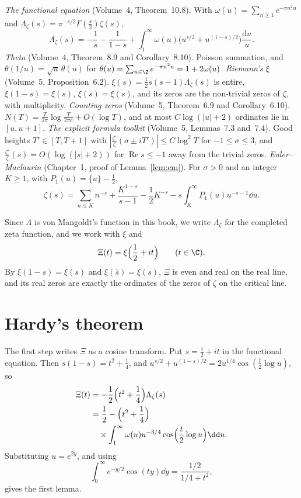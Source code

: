 \begin{reminder}
\emph{The functional equation} (Volume~4, Theorem~10.8). With $\omega(u)=\sum_{n\ge1}e^{-\pi n^2u}$ and $\Lambda_\zeta(s)=\pi^{-s/2}\Gamma(\frac s2)\zeta(s)$,
\[
\Lambda_\zeta(s)=-\frac1s-\frac1{1-s}+\int_1^\infty\omega(u)\bigl(u^{s/2}+u^{(1-s)/2}\bigr)\frac{\mathrm du}u.
\]
\emph{Theta} (Volume~4, Theorem~8.9 and Corollary~8.10). Poisson summation, and $\theta(1/u)=\sqrt u\,\theta(u)$ for $\theta(u)=\sum_{n\in\Z}e^{-\pi n^2u}=1+2\omega(u)$.
\emph{Riemann's $\xi$} (Volume~5, Proposition~6.2). $\xi(s)=\frac12s(s-1)\Lambda_\zeta(s)$ is entire, $\xi(1-s)=\xi(s)$, $\xi(\bar s)=\overline{\xi(s)}$, and its zeros are the non-trivial zeros of $\zeta$, with multiplicity.
\emph{Counting zeros} (Volume~5, Theorem~6.9 and Corollary~6.10). $N(T)=\frac T{2\pi}\log\frac T{2\pi e}+O(\log T)$, and at most $C\log(|u|+2)$ ordinates lie in $[u,u+1]$.
\emph{The explicit formula toolkit} (Volume~5, Lemmas~7.3 and~7.4). Good heights $T'\in[T,T+1]$ with $|\frac{\zeta'}\zeta(\sigma\pm iT')|\le C\log^2T$ for $-1\le\sigma\le3$, and $\frac{\zeta'}\zeta(s)=O(\log(|s|+2))$ for $\operatorname{Re}s\le-1$ away from the trivial zeros.
\emph{Euler--Maclaurin} (Chapter~1, proof of Lemma~\ref{lem:em}). For $\sigma>0$ and an integer $K\ge1$, with $P_1(u)=\{u\}-\frac12$,
\[
\zeta(s)=\sum_{n\le K}n^{-s}+\frac{K^{1-s}}{s-1}-\frac12K^{-s}-s\int_K^\infty P_1(u)u^{-s-1}\dd u.
\]
\end{reminder}

Since $\Lambda$ is von Mangoldt's function in this book, we write $\Lambda_\zeta$ for the completed zeta function, and we work with $\xi$ and
\[
\Xi(t)=\xi\Bigl(\frac12+it\Bigr)\qquad(t\in\C).
\]
By $\xi(1-s)=\xi(s)$ and $\xi(\bar s)=\overline{\xi(s)}$, $\Xi$ is even and real on the real line, and its real zeros are exactly the ordinates of the zeros of $\zeta$ on the critical line.

\section{Hardy's theorem}

The first step writes $\Xi$ as a cosine transform. Put $s=\frac12+it$ in the functional equation. Then $s(1-s)=t^2+\frac14$, and $u^{s/2}+u^{(1-s)/2}=2u^{1/4}\cos(\frac t2\log u)$, so
\[
\begin{aligned}\Xi(t)&=-\frac12\Bigl(t^2+\frac14\Bigr)\Lambda_\zeta(s)\\&=\frac12-\Bigl(t^2+\frac14\Bigr)\\&\quad\times\int_1^\infty\omega(u)u^{-3/4}\cos\Bigl(\frac t2\log u\Bigr)\dd u.\end{aligned}
\]
Substituting $u=e^{2y}$, and using
\[
\int_0^\infty e^{-y/2}\cos(ty)\dd y=\frac{1/2}{1/4+t^2},
\]
gives the first lemma.

